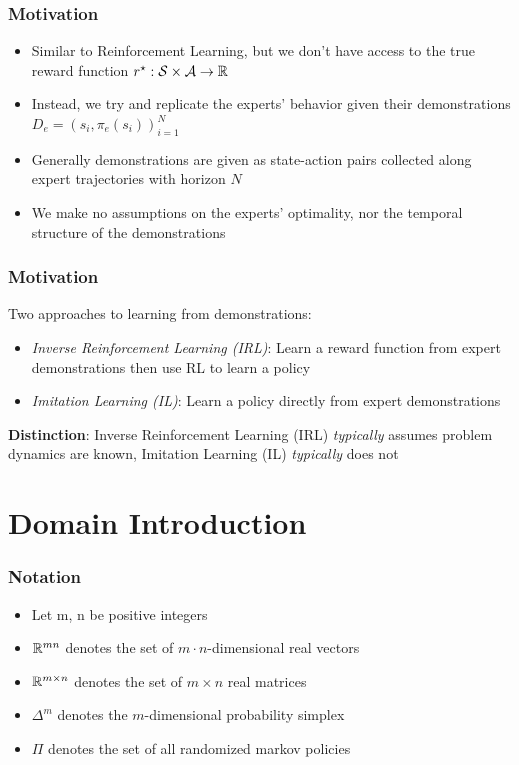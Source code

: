 \documentclass{beamer}
\begin{document}
\begin{frame}
\frametitle{Motivation}
	\begin{itemize}
		\item Similar to Reinforcement Learning, but we don't have access to the true reward function $r^\star : \mathcal{S} \times \mathcal{A} \to \mathbb{R}$
		\item Instead, we try and replicate the experts' behavior given their demonstrations $D_e = (s_i, \pi_e(s_i))_{i=1}^N$
		\item Generally demonstrations are given as state-action pairs collected along expert trajectories with horizon $N$
		\item We make no assumptions on the experts' optimality, nor the temporal structure of the demonstrations
	\end{itemize}
\end{frame}

\begin{frame}
\frametitle{Motivation}
Two approaches to learning from demonstrations:
\begin{itemize}
	\item \emph{Inverse Reinforcement Learning (IRL)}: Learn a reward function from expert demonstrations then use RL to learn a policy
	\item \emph{Imitation Learning (IL)}: Learn a policy directly from expert demonstrations
\end{itemize}
\textbf{Distinction}: Inverse Reinforcement Learning (IRL) \emph{typically} assumes problem dynamics are known, Imitation Learning (IL) \emph{typically} does not
\end{frame}

\section*{Domain Introduction}

\begin{frame}
	\frametitle{Notation}
	\begin{itemize}
		\item Let m, n be positive integers
		\item $\mathbb{R}^{mn}$ denotes the set of $m \cdot n$-dimensional real vectors
		\item $\mathbb{R}^{m \times n}$ denotes the set of $m \times n$ real matrices
		\item $\Delta^m$ denotes the $m$-dimensional probability simplex
		\item $\Pi$ denotes the set of all randomized markov policies
	\end{itemize}
\end{frame}
\end{document}

